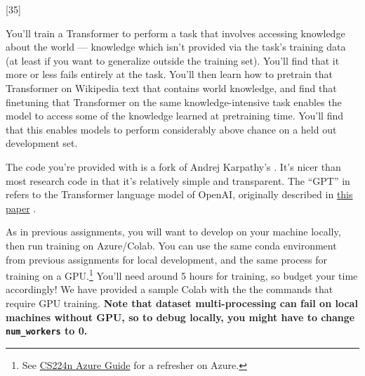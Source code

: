 \graphicspath{ {images/} }

\newcommand{\Real}{\mathbb{R}}
\newcommand{\Int}{\mathbb{Z}}

\newcommand{\henc}{\bh^{\text{enc}}}
\newcommand{\hencfw}[1]{\overrightarrow{\henc_{#1}}}
\newcommand{\hencbw}[1]{\overleftarrow{\henc_{#1}}}

\newcommand{\cenc}{\bc^{\text{enc}}}
\newcommand{\cencfw}[1]{\overrightarrow{\cenc_{#1}}}
\newcommand{\cencbw}[1]{\overleftarrow{\cenc_{#1}}}

\newcommand{\hdec}{\bh^{\text{dec}}}

\newcommand{\cdec}{\bc^{\text{dec}}}

\newcommand{\AK}[1]{{\color{blue} {\bf (AK: #1)}}}


\lstset{basicstyle=\ttfamily,columns=flexible,numbers=none}

[35]
\label{sec:char_enc}

You'll train a Transformer to perform a task that involves accessing knowledge about the world --- knowledge which isn't provided via the task's training data (at least if you want to generalize outside the training set). You'll find that it more or less fails entirely at the task.
You'll then learn how to pretrain that Transformer on Wikipedia text that contains world knowledge, and find that finetuning that Transformer on the same knowledge-intensive task enables the model to access some of the knowledge learned at pretraining time.
You'll find that this enables models to perform considerably above chance on a held out development set.


The code you're provided with is a fork of Andrej Karpathy's \href{https://github.com/karpathy/minGPT}{\mingpt}.
It's nicer than most research code in that it's relatively simple and transparent.
The ``GPT'' in \mingpt refers to the Transformer language model of OpenAI, originally described in \href{https://s3-us-west-2.amazonaws.com/openai-assets/research-covers/language-unsupervised/language_understanding_paper.pdf}{this paper} \cite{radford2018improving}.

As in previous assignments, you will want to develop on your machine locally, then run training on Azure/Colab. You can use the same conda environment from previous assignments for local development, and the same process for training on a GPU.\footnote{See \href{https://docs.google.com/document/d/11kRyfClhTi4-MC1feWWCMI31fHpTzddASsDa48_Dd9E/edit?usp=sharing}{CS224n Azure Guide} for a refresher on Azure.}
You'll need around 5 hours for training, so budget your time accordingly! We have provided a sample Colab with the the commands that require GPU training. \textbf{Note that dataset multi-processing can fail on local machines without GPU, so to debug locally, you might have to change \texttt{num\_workers} to 0.}

